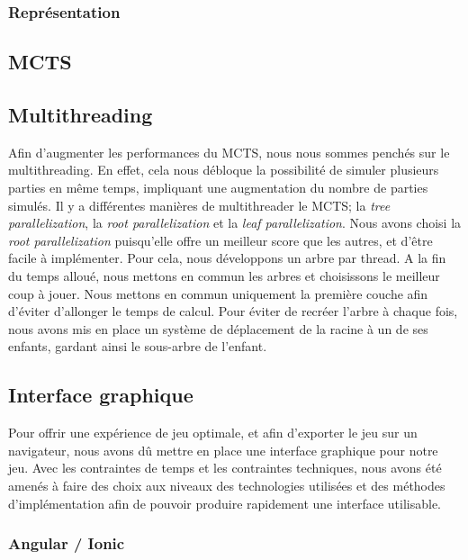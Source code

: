 \documentclass[a4paper,11pt]{article}
\begin{document}
\hypertarget{repruxe9sentation}{%
\subsubsection{Représentation}\label{repruxe9sentation}}

\hypertarget{mcts}{%
\subsection{MCTS}\label{mcts}}

\hypertarget{multithreading}{%
\subsection{Multithreading}\label{multithreading}}

Afin d'augmenter les performances du MCTS, nous nous sommes penchés sur
le multithreading. En effet, cela nous débloque la possibilité de
simuler plusieurs parties en même temps, impliquant une augmentation du
nombre de parties simulés. Il y a différentes manières de multithreader
le MCTS; la \emph{tree parallelization}, la \emph{root parallelization}
et la \emph{leaf parallelization}. \citep{handsOnWebAssembly} Nous avons
choisi la \emph{root parallelization} puisqu'elle offre un meilleur
score que les autres, et d'être facile à implémenter. Pour cela, nous
développons un arbre par thread. A la fin du temps alloué, nous mettons
en commun les arbres et choisissons le meilleur coup à jouer. Nous
mettons en commun uniquement la première couche afin d'éviter d'allonger
le temps de calcul. Pour éviter de recréer l'arbre à chaque fois, nous
avons mis en place un système de déplacement de la racine à un de ses
enfants, gardant ainsi le sous-arbre de l'enfant.

\hypertarget{interface-graphique}{%
\subsection{Interface graphique}\label{interface-graphique}}

Pour offrir une expérience de jeu optimale, et afin d'exporter le jeu
sur un navigateur, nous avons dû mettre en place une interface graphique
pour notre jeu. Avec les contraintes de temps et les contraintes
techniques, nous avons été amenés à faire des choix aux niveaux des
technologies utilisées et des méthodes d'implémentation afin de pouvoir
produire rapidement une interface utilisable.

\hypertarget{angular-ionic}{%
\subsubsection{Angular / Ionic}\label{angular-ionic}}
\end{document}
